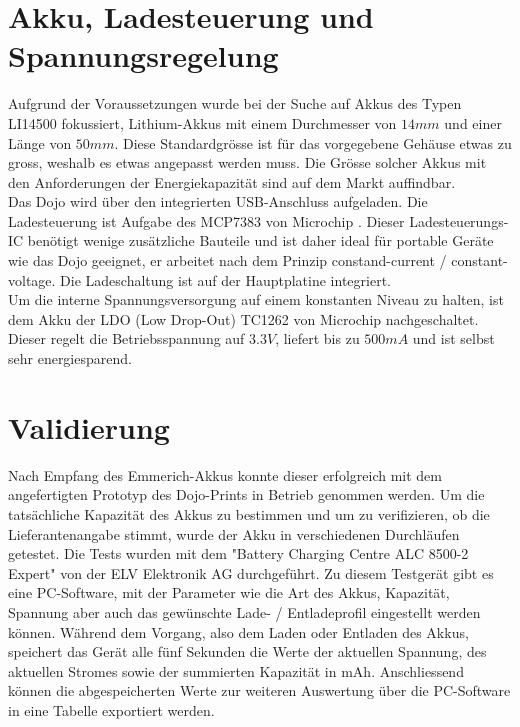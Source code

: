 \section{Akku, Ladesteuerung und Spannungsregelung}

Aufgrund der Voraussetzungen wurde bei der Suche auf Akkus des Typen LI14500 fokussiert, Lithium-Akkus mit einem Durchmesser von $14mm$ und einer Länge von $50mm$. Diese Standardgrösse ist für das vorgegebene Gehäuse etwas zu gross, weshalb es etwas angepasst werden muss. Die Grösse solcher Akkus mit den Anforderungen der Energiekapazität sind auf dem Markt auffindbar.\\

Das Dojo wird über den integrierten USB-Anschluss aufgeladen. Die Ladesteuerung ist Aufgabe des MCP7383 von Microchip . Dieser Ladesteuerungs-IC benötigt wenige zusätzliche Bauteile und ist daher ideal für portable Geräte wie das Dojo geeignet, er arbeitet nach dem Prinzip constand-current / constant-voltage. Die Ladeschaltung ist auf der Hauptplatine integriert.\\

Um die interne Spannungsversorgung auf einem konstanten Niveau zu halten, ist dem Akku der LDO (Low Drop-Out) TC1262 von Microchip nachgeschaltet. Dieser regelt die Betriebsspannung auf $3.3V$, liefert bis zu $500mA$ und ist selbst sehr energiesparend.


\section{Validierung}

Nach Empfang des Emmerich-Akkus konnte dieser erfolgreich mit dem angefertigten Prototyp des Dojo-Prints in Betrieb genommen werden. Um die tatsächliche Kapazität des Akkus zu bestimmen und um zu verifizieren, ob die Lieferantenangabe stimmt, wurde der Akku in verschiedenen Durchläufen getestet. Die Tests wurden mit dem "Battery Charging Centre ALC 8500-2 Expert" von der ELV Elektronik AG durchgeführt. Zu diesem Testgerät gibt es eine PC-Software, mit der Parameter wie die Art des Akkus, Kapazität, Spannung aber auch das gewünschte Lade- / Entladeprofil eingestellt werden können. Während dem Vorgang, also dem Laden oder Entladen des Akkus, speichert das Gerät alle fünf Sekunden die Werte der aktuellen Spannung, des aktuellen Stromes sowie der summierten Kapazität in mAh. Anschliessend können die abgespeicherten Werte zur weiteren Auswertung über die PC-Software in eine Tabelle exportiert werden.\\

